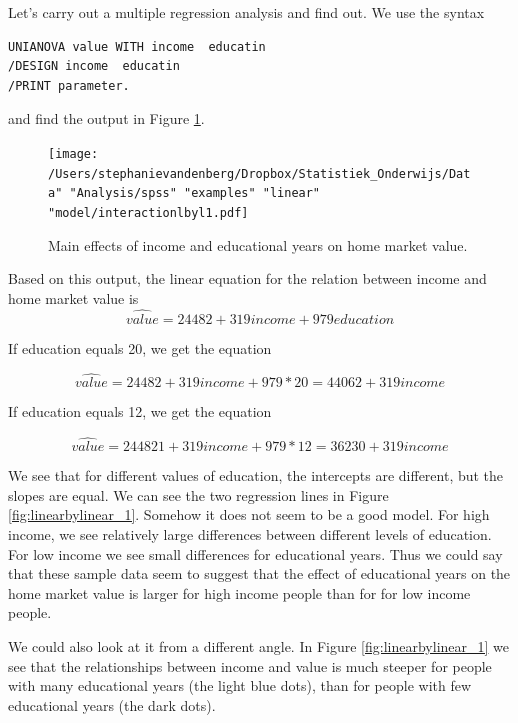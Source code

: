 \documentclass[]{report}\usepackage[]{graphicx}\usepackage[]{color}
\begin{document}
Let's carry out a multiple regression analysis and find out. We use the syntax

\begin{verbatim}
UNIANOVA value WITH income  educatin
/DESIGN income  educatin 
/PRINT parameter.
\end{verbatim}

and find the output in Figure \ref{fig:interactionlbyl1}. 

\begin{figure}[h]
    \begin{center}
       \texttt{[image: /Users/stephanievandenberg/Dropbox/Statistiek\_Onderwijs/Data" "Analysis/spss" "examples"  "linear" "model/interactionlbyl1.pdf]}
    \end{center}
    \label{fig:interactionlbyl1}
    \caption{Main effects of income and educational years on home market value.}
\end{figure}

Based on this output, the linear equation for the relation between income and home market value is 
\begin{equation}
\widehat{value}= 24482 + 319 income + 979 education
\end{equation}

If education equals 20, we get the equation

\begin{equation}
\widehat{value}= 24482 + 319 income + 979 * 20 = 44062 + 319 income
\end{equation}

If education equals 12, we get the equation 

\begin{equation}
\widehat{value}= 244821 + 319 income + 979 * 12 = 36230 + 319 income
\end{equation}

We see that for different values of education, the intercepts are different, but the slopes are equal. We can see the two regression lines in Figure \ref{fig:linearbylinear_1}. Somehow it does not seem to be a good model. For high income, we see relatively large differences between different levels of education. For low income we see small differences for educational years. Thus we could say that these sample data seem to suggest that the effect of educational years on the home market value is larger for high income people than for for low income people.

We could also look at it from a different angle. In Figure \ref{fig:linearbylinear_1} we see that the relationships between income and value is much steeper for people with many educational years (the light blue dots), than for people with few educational years (the dark dots).
\end{document}
